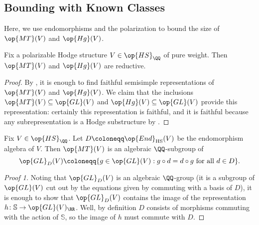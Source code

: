 \documentclass[../thesis.tex]{subfiles}
\begin{document}
\subsection{Bounding with Known Classes} \label{subsec:mt-class-bounds}
Here, we use endomorphisms and the polarization to bound the size of $\op{MT}(V)$ and $\op{Hg}(V)$.
\begin{lemma} \label{lem:mt-hg-reductive}
	Fix a polarizable Hodge structure $V\in\op{HS}_\QQ$ of pure weight. Then $\op{MT}(V)$ and $\op{Hg}(V)$ are reductive.
\end{lemma}
\begin{proof}
	By \cite[Corollary~19.18]{milne-alg-groups}, it is enough to find faithful semisimple representations of $\op{MT}(V)$ and $\op{Hg}(V)$. We claim that the inclusions $\op{MT}(V)\subseteq\op{GL}(V)$ and $\op{Hg}(V)\subseteq\op{GL}(V)$ provide this representation: certainly this representation is faithful, and it is faithful because any subrepresentation is a Hodge substructure by .
\end{proof}
\begin{lemma} \label{lem:mt-commutes-with-endo}
	Fix $V\in\op{HS}_\QQ$. Let $D\coloneqq\op{End}_{\mathrm{HS}}(V)$ be the endomorphism algebra of $V$. Then $\op{MT}(V)$ is an algebraic $\QQ$-subgroup of
	\[\op{GL}_D(V)\coloneqq\{g\in\op{GL}(V):g\circ d=d\circ g\text{ for all }d\in D\}.\]
\end{lemma}
\begin{proof}[Proof 1]
	Noting that $\op{GL}_D(V)$ is an algebraic $\QQ$-group (it is a subgroup of $\op{GL}(V)$ cut out by the equations given by commuting with a basis of $D$), it is enough to show that $\op{GL}_D(V)$ contains the image of the representation $h\colon\mathbb S\to\op{GL}(V)_\RR$. Well, by definition $D$ consists of morphisms commuting with the action of $\mathbb S$, so the image of $h$ must commute with $D$.
\end{proof}
\end{document}
